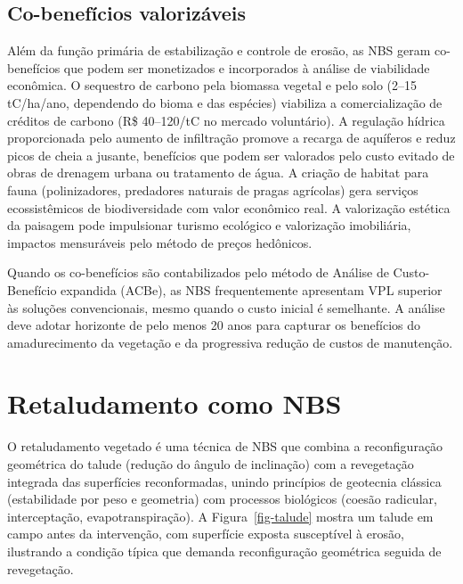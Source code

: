 \documentclass[
  portuguese,
  11pt,
  a4paper,
  open=any]{scrbook}
\begin{document}
\subsection{Co-benefícios
valorizáveis}\label{co-benefuxedcios-valorizuxe1veis}

Além da função primária de estabilização e controle de erosão, as NBS
geram co-benefícios que podem ser monetizados e incorporados à análise
de viabilidade econômica. O sequestro de carbono pela biomassa vegetal e
pelo solo (2--15 tC/ha/ano, dependendo do bioma e das espécies)
viabiliza a comercialização de créditos de carbono (R\$ 40--120/tC no
mercado voluntário). A regulação hídrica proporcionada pelo aumento de
infiltração promove a recarga de aquíferos e reduz picos de cheia a
jusante, benefícios que podem ser valorados pelo custo evitado de obras
de drenagem urbana ou tratamento de água. A criação de habitat para
fauna (polinizadores, predadores naturais de pragas agrícolas) gera
serviços ecossistêmicos de biodiversidade com valor econômico real. A
valorização estética da paisagem pode impulsionar turismo ecológico e
valorização imobiliária, impactos mensuráveis pelo método de preços
hedônicos.

\begin{tcolorbox}[enhanced jigsaw, leftrule=.75mm, colframe=quarto-callout-tip-color-frame, colback=white, bottomrule=.15mm, opacityback=0, colbacktitle=quarto-callout-tip-color!10!white, breakable, bottomtitle=1mm, opacitybacktitle=0.6, title=\textcolor{quarto-callout-tip-color}{\faLightbulb}\hspace{0.5em}{Valoração de co-benefícios}, titlerule=0mm, toprule=.15mm, toptitle=1mm, rightrule=.15mm, left=2mm, arc=.35mm, coltitle=black]

Quando os co-benefícios são contabilizados pelo método de Análise de
Custo-Benefício expandida (ACBe), as NBS frequentemente apresentam VPL
superior às soluções convencionais, mesmo quando o custo inicial é
semelhante. A análise deve adotar horizonte de pelo menos 20 anos para
capturar os benefícios do amadurecimento da vegetação e da progressiva
redução de custos de manutenção.

\end{tcolorbox}

\section{Retaludamento como NBS}\label{retaludamento-como-nbs}

O retaludamento vegetado é uma técnica de NBS que combina a
reconfiguração geométrica do talude (redução do ângulo de inclinação)
com a revegetação integrada das superfícies reconformadas, unindo
princípios de geotecnia clássica (estabilidade por peso e geometria) com
processos biológicos (coesão radicular, interceptação,
evapotranspiração). A Figura~\ref{fig-talude} mostra um talude em campo
antes da intervenção, com superfície exposta susceptível à erosão,
ilustrando a condição típica que demanda reconfiguração geométrica
seguida de revegetação.
\end{document}
